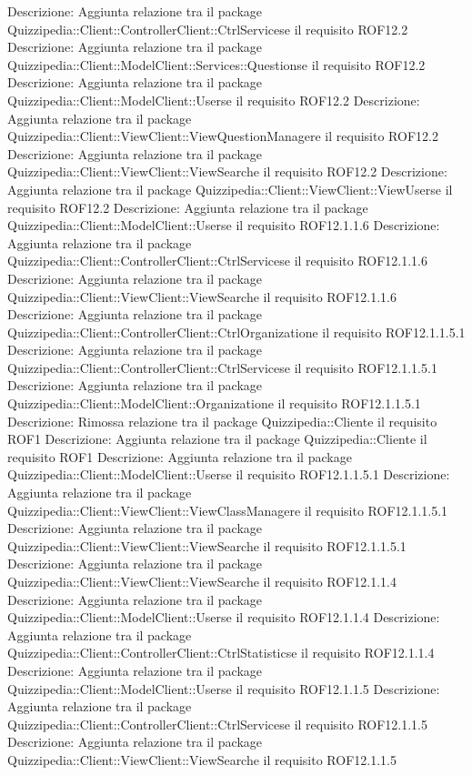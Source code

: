 Descrizione: Aggiunta relazione tra il package Quizzipedia::Client::ControllerClient::CtrlServicese il requisito ROF12.2 
Descrizione: Aggiunta relazione tra il package Quizzipedia::Client::ModelClient::Services::Questionse il requisito ROF12.2 
Descrizione: Aggiunta relazione tra il package Quizzipedia::Client::ModelClient::Userse il requisito ROF12.2 
Descrizione: Aggiunta relazione tra il package Quizzipedia::Client::ViewClient::ViewQuestionManagere il requisito ROF12.2 
Descrizione: Aggiunta relazione tra il package Quizzipedia::Client::ViewClient::ViewSearche il requisito ROF12.2 
Descrizione: Aggiunta relazione tra il package Quizzipedia::Client::ViewClient::ViewUserse il requisito ROF12.2 
Descrizione: Aggiunta relazione tra il package Quizzipedia::Client::ModelClient::Userse il requisito ROF12.1.1.6 
Descrizione: Aggiunta relazione tra il package Quizzipedia::Client::ControllerClient::CtrlServicese il requisito ROF12.1.1.6 
Descrizione: Aggiunta relazione tra il package Quizzipedia::Client::ViewClient::ViewSearche il requisito ROF12.1.1.6 
Descrizione: Aggiunta relazione tra il package Quizzipedia::Client::ControllerClient::CtrlOrganizatione il requisito ROF12.1.1.5.1 
Descrizione: Aggiunta relazione tra il package Quizzipedia::Client::ControllerClient::CtrlServicese il requisito ROF12.1.1.5.1 
Descrizione: Aggiunta relazione tra il package Quizzipedia::Client::ModelClient::Organizatione il requisito ROF12.1.1.5.1 
Descrizione: Rimossa relazione tra il package Quizzipedia::Cliente il requisito ROF1 
Descrizione: Aggiunta relazione tra il package Quizzipedia::Cliente il requisito ROF1 
Descrizione: Aggiunta relazione tra il package Quizzipedia::Client::ModelClient::Userse il requisito ROF12.1.1.5.1 
Descrizione: Aggiunta relazione tra il package Quizzipedia::Client::ViewClient::ViewClassManagere il requisito ROF12.1.1.5.1 
Descrizione: Aggiunta relazione tra il package Quizzipedia::Client::ViewClient::ViewSearche il requisito ROF12.1.1.5.1 
Descrizione: Aggiunta relazione tra il package Quizzipedia::Client::ViewClient::ViewSearche il requisito ROF12.1.1.4 
Descrizione: Aggiunta relazione tra il package Quizzipedia::Client::ModelClient::Userse il requisito ROF12.1.1.4 
Descrizione: Aggiunta relazione tra il package Quizzipedia::Client::ControllerClient::CtrlStatisticse il requisito ROF12.1.1.4 
Descrizione: Aggiunta relazione tra il package Quizzipedia::Client::ModelClient::Userse il requisito ROF12.1.1.5 
Descrizione: Aggiunta relazione tra il package Quizzipedia::Client::ControllerClient::CtrlServicese il requisito ROF12.1.1.5 
Descrizione: Aggiunta relazione tra il package Quizzipedia::Client::ViewClient::ViewSearche il requisito ROF12.1.1.5 
